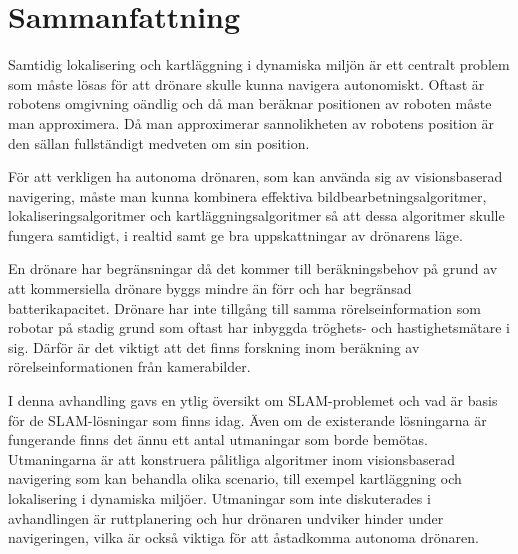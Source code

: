 \chapter{Sammanfattning}

Samtidig lokalisering och kartläggning i dynamiska miljön är ett centralt problem som måste lösas för att drönare skulle kunna navigera autonomiskt. Oftast är robotens omgivning oändlig och då man beräknar positionen av roboten måste man approximera. Då man approximerar sannolikheten av robotens position är den sällan fullständigt medveten om sin position. 

För att verkligen ha autonoma drönaren, som kan använda sig av visionsbaserad navigering, måste man kunna kombinera effektiva bildbearbetningsalgoritmer, lokaliseringsalgoritmer och kartläggningsalgoritmer så att dessa algoritmer skulle fungera samtidigt, i realtid samt ge bra uppskattningar av drönarens läge. 

En drönare har begränsningar då det kommer till beräkningsbehov på grund av att kommersiella drönare byggs mindre än förr och har begränsad batterikapacitet. Drönare har inte tillgång till samma rörelseinformation som robotar på stadig grund som oftast har inbyggda tröghets- och hastighetsmätare i sig. Därför är det viktigt att det finns forskning inom beräkning av rörelseinformationen från kamerabilder. 

I denna avhandling gavs en ytlig översikt om SLAM-problemet och vad är basis för de SLAM-lösningar som finns idag. Även om de existerande lösningarna är fungerande finns det ännu ett antal utmaningar som borde bemötas. Utmaningarna är att konstruera pålitliga algoritmer inom visionsbaserad navigering som kan behandla olika scenario, till exempel kartläggning och lokalisering i dynamiska miljöer. Utmaningar som inte diskuterades i avhandlingen är ruttplanering och hur drönaren undviker hinder under navigeringen, vilka är också viktiga för att åstadkomma autonoma drönaren.


